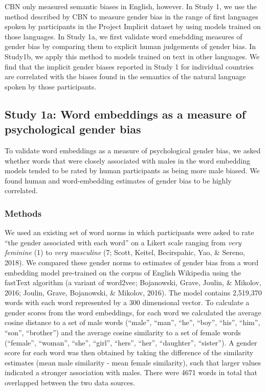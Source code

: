 \documentclass[man,floatsintext]{apa6}
\theoremstyle{definition}
\theoremstyle{definition}
\theoremstyle{definition}
\theoremstyle{remark}
\begin{document}
CBN only measured semantic biases in English, however. In Study 1, we
use the method described by CBN to measure gender bias in the range of
first languages spoken by participants in the Project Implicit dataset
by using models trained on those languages. In Study 1a, we first
validate word emebdding measures of gender bias by comparing them to
explicit human judgements of gender bias. In Study1b, we apply this
method to models trained on text in other languages. We find that the
implicit gender biases reported in Study 1 for individual countries are
correlated with the biases found in the semantics of the natural
language spoken by those participants.

\subsection{Study 1a: Word embeddings as a measure of psychological
gender
bias}\label{study-1a-word-embeddings-as-a-measure-of-psychological-gender-bias}

To validate word embeddings as a measure of psychological gender bias,
we asked whether words that were closely associated with males in the
word embedding models tended to be rated by human participants as being
more male biased. We found human and word-embedding estimates of gender
bias to be highly correlated.

\subsubsection{Methods}\label{methods}

We used an existing set of word norms in which participants were asked
to rate \enquote{the gender associated with each word} on a Likert scale
ranging from \emph{very feminine} (1) to \emph{very masculine} (7;
Scott, Keitel, Becirspahic, Yao, \& Sereno, 2018). We compared these
gender norms to estimates of gender bias from a word embedding model
pre-trained on the corpus of English Wikipedia using the fastText
algorithm (a variant of word2vec; Bojanowski, Grave, Joulin, \& Mikolov,
2016; Joulin, Grave, Bojanowski, \& Mikolov, 2016). The model contains
2,519,370 words with each word represented by a 300 dimensional vector.
To calculate a gender scores from the word embeddings, for each word we
calculated the average cosine distance to a set of male words
(\enquote{male}, \enquote{man}, \enquote{he}, \enquote{boy},
\enquote{his}, \enquote{him}, \enquote{son}, \enquote{brother}) and the
average cosine similarity to a set of female words (\enquote{female},
\enquote{woman}, \enquote{she}, \enquote{girl}, \enquote{hers},
\enquote{her}, \enquote{daughter}, \enquote{sister}). A gender score for
each word was then obtained by taking the difference of the similarity
estimates (mean male similarity - mean female similarity), such that
larger values indicated a stronger association with males. There were
4671 words in total that overlapped between the two data sources.
\end{document}
